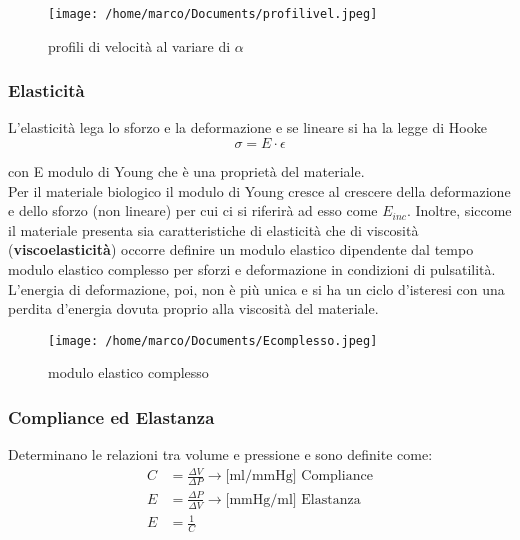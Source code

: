 \documentclass[10pt]{article}
\begin{document}
\begin{figure}[h!]
\centering
\texttt{[image: /home/marco/Documents/profilivel.jpeg]}
\caption{profili di velocità al variare di $\alpha$}
\label{fig:profilivel}
\end{figure}

\subsubsection{Elasticità}

L'elasticità lega lo sforzo e la deformazione e se lineare si ha la legge di Hooke 
\begin{equation}
    \sigma=E \cdot \epsilon
\end{equation}

con E modulo di Young che è una proprietà del materiale. \\
Per il materiale biologico il modulo di Young cresce al crescere della deformazione e dello sforzo (non lineare) per cui ci si riferirà ad esso come $E_{inc}$.
Inoltre, siccome il materiale presenta sia caratteristiche di elasticità che di viscosità (\textbf{viscoelasticità}) occorre definire un modulo elastico dipendente dal tempo \textrightarrow modulo elastico complesso per sforzi e deformazione in condizioni di pulsatilità.\\
L'energia di deformazione, poi, non è più unica e si ha un ciclo d'isteresi con una perdita d'energia dovuta proprio alla viscosità del materiale.

 \begin{figure}[h!]
\centering
\texttt{[image: /home/marco/Documents/Ecomplesso.jpeg]}
\caption{modulo elastico complesso}
\label{fig:Ecomplesso}
\end{figure}

\subsubsection{Compliance ed Elastanza}

Determinano le relazioni tra volume e pressione e sono definite come:
    \begin{align*}
        C & =\frac{\Delta V}{\Delta P} \rightarrow   \text{[ml/mmHg] Compliance}\\
        E & =\frac{\Delta P}{\Delta V} \rightarrow  \text{[mmHg/ml] Elastanza} \\
        E & =\frac{1}{C}
    \end{align*}
\end{document}
